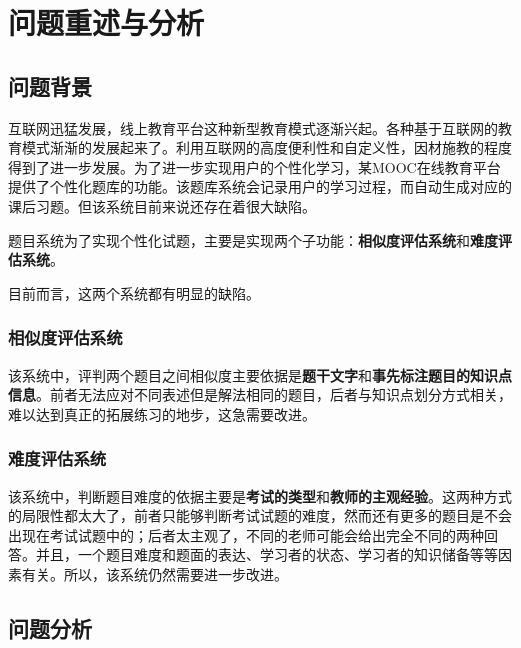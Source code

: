\setcounter{page}{1}    %

%
%

\section{问题重述与分析}

\subsection{问题背景}

互联网迅猛发展，线上教育平台这种新型教育模式逐渐兴起。各种基于互联网的教育模式渐渐的发展起来了。利用互联网的高度便利性和自定义性，因材施教的程度得到了进一步发展。为了进一步实现用户的个性化学习，某\linebreak MOOC在线教育平台提供了个性化题库的功能。该题库系统会记录用户的学习过程，而自动生成对应的课后习题。但该系统目前来说还存在着很大缺陷。

题目系统为了实现个性化试题，主要是实现两个子功能：\textbf{相似度评估系统}和\textbf{难度评估系统}。

目前而言，这两个系统都有明显的缺陷。

\subsubsection{相似度评估系统}

该系统中，评判两个题目之间相似度主要依据是\textbf{题干文字}和\textbf{事先标注题目的知识点信息}。前者无法应对不同表述但是解法相同的题目，后者与知识点划分方式相关，难以达到真正的拓展练习的地步，这急需要改进。

\subsubsection{难度评估系统}

该系统中，判断题目难度的依据主要是\textbf{考试的类型}和\textbf{教师的主观经验}。这两种方式的局限性都太大了，前者只能够判断考试试题的难度，然而还有更多的题目是不会出现在考试试题中的；后者太主观了，不同的老师可能会给出完全不同的两种回答。并且，一个题目难度和题面的表达、学习者的状态、学习者的知识储备等等因素有关。所以，该系统仍然需要进一步改进。

\subsection{问题分析}
 
